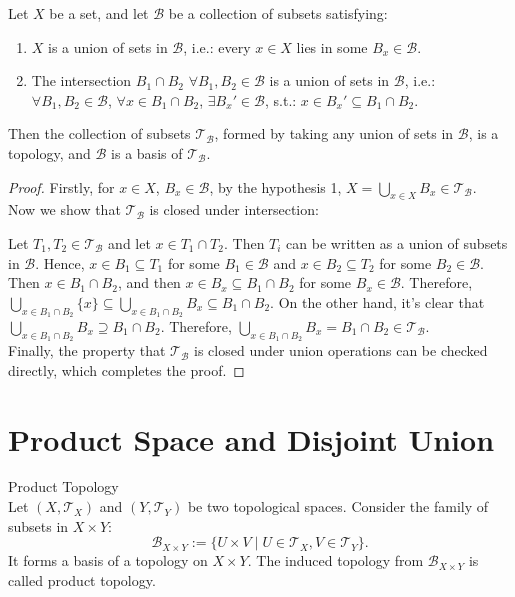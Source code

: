 \begin{proposition}
    Let $X$ be a set, and let $\mathcal{B}$ be a collection of subsets satisfying:
    \begin{enumerate}
        \item $X$ is a union of sets in $\mathcal{B}$, i.e.: every $x \in X$ lies in some $B_x \in \mathcal{B}$.
        \item The intersection $B_1 \cap B_2$ $\forall B_1,B_2 \in \mathcal{B}$ is a union of sets in $\mathcal{B}$, i.e.: $\forall B_1,B_2 \in \mathcal{B}$, $\forall x \in B_1\cap B_2$, $\exists B_x' \in \mathcal{B}$, s.t.: $x \in B_x' \subseteq B_1\cap B_2$.
    \end{enumerate}
    Then the collection of subsets $\mathcal{T}_\mathcal{B}$, formed by taking any union of sets in $\mathcal{B}$, is a topology, and $\mathcal{B}$ is a basis of $\mathcal{T}_\mathcal{B}$.
\end{proposition}

\begin{proof}
    Firstly, for $x \in X$, $B_x \in \mathcal{B}$, by the hypothesis 1, $X = \bigcup_{x\in X} B_x \in \mathcal{T}_\mathcal{B}$.\\
    Now we show that $\mathcal{T}_\mathcal{B}$ is closed under intersection: 

    Let $T_1,T_2 \in \mathcal{T}_\mathcal{B}$ and let $x \in T_1 \cap T_2$. Then $T_i $ can be written as a union of subsets in $\mathcal{B}$. Hence, $x \in B_1 \subseteq T_1$ for some $B_1 \in \mathcal{B}$ and $x \in B_2 \subseteq T_2$ for some $B_2 \in \mathcal{B}$. Then $x \in B_1 \cap B_2$, and then $x \in B_x \subseteq B_1\cap B_2$ for some $B_x \in \mathcal{B}$. Therefore, $\bigcup_{x \in B_1\cap B_2} \{x\} \subseteq \bigcup_{x \in B_1 \cap B_2}B_x \subseteq B_1\cap B_2$. On the other hand, it's clear that $\bigcup_{x \in B_1 \cap B_2}B_x \supseteq B_1\cap B_2$. Therefore, $\bigcup_{x \in B_1 \cap B_2}B_x = B_1\cap B_2 \in \mathcal{T}_\mathcal{B}$.\\
    Finally, the property that $\mathcal{T}_\mathcal{B}$ is closed under union operations can be checked directly, which completes the proof.
\end{proof}

\section{Product Space and Disjoint Union}

\begin{definition}{Product Topology}\\
Let $(X,\mathcal{T}_X)$ and $(Y,\mathcal{T}_Y)$ be two topological spaces. Consider the family of subsets in $X \times Y$:
$$\mathcal{B} _{X\times Y} := \{U\times V\mid U \in \mathcal{T}_X, V\in \mathcal{T}_Y\}.$$
It forms a basis of a topology on $X\times Y$. The induced topology from $\mathcal{B}_{X\times Y}$ is called product topology.
\end{definition}


